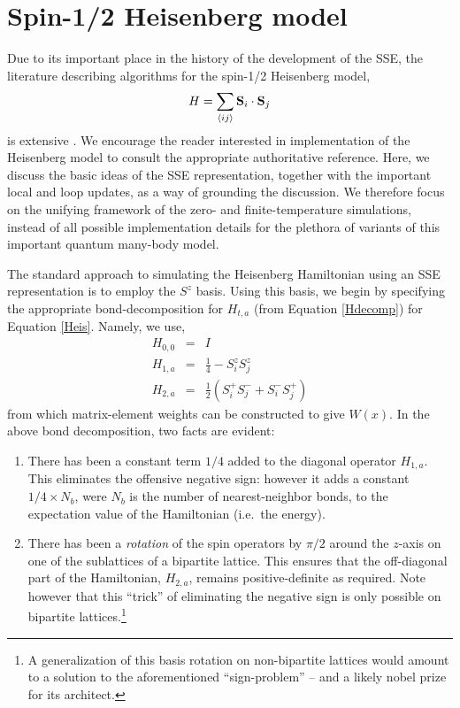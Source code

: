 \documentclass[vecphys]{svmult}
\begin{document}
\section{Spin-1/2 Heisenberg model} \label{Melko:HeisSec}

Due to its important place in the history of the development of the SSE, the literature describing algorithms for the spin-1/2 Heisenberg model,
\begin{equation}
H = \sum_{\langle i j \rangle} {\bf S}_i \cdot {\bf S}_j \label{Heis}
\end{equation}
is extensive \cite{Melko:Handscomb62, Melko:Henelius00, Melko:Sandvik91, Melko:Sandvik99,  Melko:SandvikHeis,Melko:Syljuasen02}.  We encourage the reader interested in implementation of the Heisenberg model to consult the appropriate authoritative reference. Here, we discuss the basic ideas of the SSE representation, together with the important local and loop updates, as a way of grounding the discussion.  We therefore focus on the unifying framework of the zero- and finite-temperature simulations, instead of all possible implementation details for the plethora of variants of this important quantum many-body model.

The  standard approach to simulating the Heisenberg Hamiltonian using an SSE representation is to employ the $S^z$ basis.  
Using this basis, we begin by specifying the appropriate bond-decomposition for $H_{t,a}$ (from Equation \ref{Hdecomp}) for Equation \ref{Heis}.
Namely, we use,
\begin{eqnarray}
H_{0,0} &=&I \\
H_{1,a} &=& \frac{1}{4} - S^z_i S^z_j \label{H1a} \label{diagB} \\
H_{2,a} &=& \frac{1}{2} (S^+_i S^-_j + S^-_i S^+_j) \label{odB}
\end{eqnarray}
from which matrix-element weights can be constructed to give $W(x)$.  In the above bond decomposition, two facts are evident:
\begin{enumerate}
\item There has been a constant term $1/4$ added to the diagonal operator $H_{1,a}$.  This eliminates the offensive negative sign: however it adds a constant $1/4 \times N_b$, were $N_b$ is the number of nearest-neighbor bonds, to the expectation value of the Hamiltonian (i.e.~the energy).
\item There has been a {\em rotation} of the spin operators by $\pi/2$ around the $z$-axis on one of the sublattices of a bipartite lattice.  This ensures that the off-diagonal part of the Hamiltonian, $H_{2,a}$, remains positive-definite as required.  Note however that this ``trick'' of eliminating the negative sign is only possible on bipartite lattices.\footnote{A generalization of this basis rotation on non-bipartite lattices would amount to a solution to the aforementioned ``sign-problem'' -- and a likely nobel prize for its architect.}
\end{enumerate}
\end{document}
